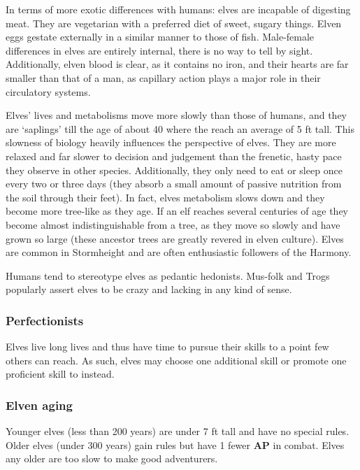 \documentclass[a4paper,11pt,oneside]{book}
\newcommand{\textlf}[1]{\textbf{\titlecap{#1}}}
\begin{document}
In terms of more exotic differences with humans: elves are incapable of digesting meat. They are vegetarian with a preferred diet of sweet, sugary things. Elven eggs gestate externally in a similar manner to those of fish. Male-female differences in elves are entirely internal, there is no way to tell by sight. Additionally, elven blood is clear, as it contains no iron, and their hearts are far smaller than that of a man, as capillary action plays a major role in their circulatory systems.

Elves' lives and metabolisms move more slowly than those of humans, and they are `saplings' till the age of about 40 where the reach an average of 5 ft tall. This slowness of biology heavily influences the perspective of elves. They are more relaxed and far slower to decision and judgement than the frenetic, hasty pace they observe in other species. Additionally, they only need to eat or sleep once every two or three days (they absorb a small amount of passive nutrition from the soil through their feet). In fact, elves metabolism slows down and they become more tree-like as they age. If an elf reaches several centuries of age they become almost indistinguishable from a tree, as they move so slowly and have grown so large (these ancestor trees are greatly revered in elven culture). Elves are common in Stormheight and are often enthusiastic followers of the Harmony. 

Humans tend to stereotype elves as pedantic hedonists. Mus-folk and Trogs popularly assert elves to be crazy and lacking in any kind of sense. 

\subsubsection*{Perfectionists}
Elves live long lives and thus have time to pursue their skills to a point few others can reach. As such, elves may choose one additional skill \textlf{proficiency} or promote one proficient skill to \textlf{adept} instead.

\subsubsection*{Elven aging}
Younger elves (less than 200 years) are under 7 ft tall and have no special rules. Older elves (under 300 years) gain \textlf{large creature} rules but have 1 fewer \textbf{AP} in combat. Elves any older are too slow to make good adventurers.
\end{document}
